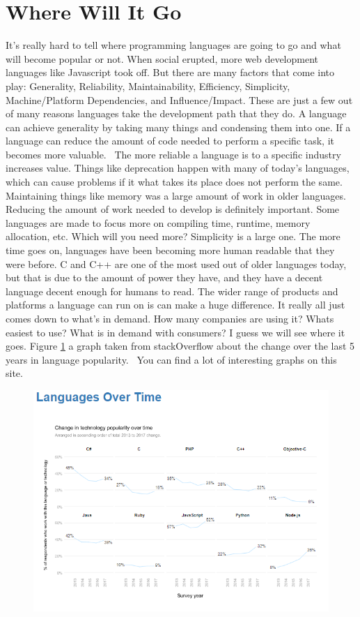 \documentclass[letterpaper, 10 pt, conference]{IEEEtran}
\begin{document}
\section{Where Will It Go}
\indent It's really hard to tell where programming languages are going to go and what will become popular or not. When social erupted, more web development languages like Javascript took off. But there are many factors that come into play: Generality, Reliability, Maintainability, Efficiency, Simplicity, Machine/Platform Dependencies, and Influence/Impact. These are just a few out of many reasons languages take the development path that they do. A language can achieve generality by taking many things and condensing them into one. If a language can reduce the amount of code needed to perform a specific task, it becomes more valuable.~\cite{ProgrammingLanguageTrends} The more reliable a language is to a specific industry increases value. Things like deprecation happen with many of today's languages, which can cause problems if it what takes its place does not perform the same. Maintaining things like memory was a large amount of work in older languages. Reducing the amount of work needed to develop is definitely important. Some languages are made to focus more on compiling time, runtime, memory allocation, etc. Which will you need more? Simplicity is a large one. The more time goes on, languages have been becoming more human readable that they were before. C and C++ are one of the most used out of older languages today, but that is due to the amount of power they have, and they have a decent language decent enough for humans to read. The wider range of products and platforms a language can run on is can make a huge difference. It really all just comes down to what's in demand. How many companies are using it? Whats easiest to use? What is in demand with consumers? I guess we will see where it goes. Figure \ref{fig:Language Over Time} a graph taken from stackOverflow about the change over the last 5 years in language popularity.~\cite{Stats} You can find a lot of interesting graphs on this site. 
\begin{figure} [!ht]
\centering
\includegraphics[scale = .9 , angle = 270]{languageOverTime.png}
\caption{}
\label{fig:Language Over Time}
\end{figure}
\newline
\end{document}
